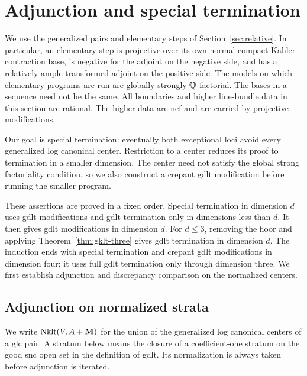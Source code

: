 \section{Adjunction and special termination}\label{sec:special}

We use the generalized pairs and elementary steps of
Section~\ref{sec:relative}.  In particular, an elementary step is
projective over its own normal compact K\"ahler contraction base, is
negative for the adjoint on the negative side, and has a relatively
ample transformed adjoint on the positive side.  The models on which
elementary programs are run are globally strongly $\mathbb Q$-factorial.
The bases in a sequence need not be the same.  All boundaries and
higher line-bundle data in this section are rational.  The higher
data are nef and are carried by projective modifications.

Our goal is special termination: eventually both exceptional loci
avoid every generalized log canonical center.  Restriction to a center
reduces its proof to termination in a smaller dimension.  The center
need not satisfy the global strong factoriality condition, so we also
construct a crepant gdlt modification before running the smaller
program.

These assertions are proved in a fixed order.  Special termination
in dimension $d$ uses gdlt modifications and gdlt termination only in
dimensions less than $d$.  It then gives gdlt modifications in
dimension $d$.  For $d\leq3$, removing the floor and applying
Theorem~\ref{thm:gklt-three} gives gdlt termination in dimension $d$.
The induction ends with special termination and crepant gdlt
modifications in dimension four; it uses full gdlt termination only
through dimension three.
We first establish adjunction and discrepancy comparison on the
normalized centers.

\subsection{Adjunction on normalized strata}

We write $\operatorname{Nklt}(V,A+\mathbf M)$ for the union of the
generalized log canonical centers of a glc pair.  A stratum below
means the closure of a coefficient-one stratum on the good snc open
set in the definition of gdlt.  Its normalization is always taken
before adjunction is iterated.

